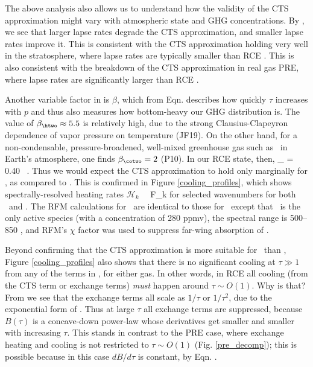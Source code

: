 \documentclass[10pt]{article}
\newcommand{\ch}{\ensuremath{\mathcal{H}}}
\newcommand{\chk}{\ensuremath{\ch_k}}
\begin{document}
The above analysis also allows us to understand how the validity of the CTS approximation might vary with atmospheric state and GHG concentrations. By , we see that larger lapse rates degrade the CTS approximation, and smaller lapse rates  improve it. This is consistent with the CTS approximation holding very well in the stratosphere, where lapse rates are typically smaller than RCE \citep[e.g.][as well as Fig. \ref{cts_h2o}]{rodgers1966}. This is also consistent with the breakdown of the CTS approximation in real gas PRE, where lapse rates are significantly larger than RCE \citep[e.g. P10 or][]{manabe1964}. 

Another variable factor in  is $\beta$, which from Eqn.  describes how quickly $\tau$ increases with $p$ and thus also measures how bottom-heavy our GHG distribution is. The value of $\beta_{\htwo}\approx 5.5$ is relatively high, due to the strong Clausius-Clapeyron dependence of vapor pressure on temperature (JF19). On the other hand, for a non-condensable, pressure-broadened, well-mixed greenhouse gas such as \cotwo\ in Earth's atmosphere, one finds $\beta_{\cotwo} = 2$ (P10). In our RCE state, then, 
\beqn
	 \gamma_{\cotwo}  =  0.40  \ .
	 \n
 \eeqn
Thus we would expect the CTS approximation to hold only marginally for \cotwo, as compared to \htwo. This is confirmed  in Figure \ref{cooling_profiles}, which shows spectrally-resolved heating rates 
\beqn
	\chk \ \equiv \   \ppp F_k 
	\label{chk}
\eeqn 
 for selected wavenumbers for both \htwo\ and \cotwo. The RFM calculations for \cotwo\ are identical to those for \htwo\ except that \cotwo\ is the only active species (with a concentration of 280 ppmv), the spectral range is 500--850 \cminverse, and  RFM's $\chi$ factor was used to suppress far-wing absorption of \cotwo.  

Beyond confirming that the CTS approximation is more suitable for \htwo\ than \cotwo,  Figure \ref{cooling_profiles} also shows that there is no significant cooling at $\tau \gg 1$ from any of the terms in , for either gas. In other words, in RCE all cooling (from the CTS term or exchange terms) \emph{must} happen around $\tau\sim O(1)$.  Why is that? From  we see that the exchange terms all scale as $1/\tau$ or $1/\tau^2$, due to the exponential form of . Thus at large $\tau$ all exchange terms are suppressed, because $B(\tau)$ is a concave-down power-law whose derivatives get smaller and smaller with increasing $\tau$. This stands in contrast to the PRE case, where exchange heating and cooling is not restricted to $\tau \sim O(1)$ (Fig. \ref{pre_decomp});  this is possible because in this case $dB/d\tau$ is constant, by Eqn. .
\end{document}
